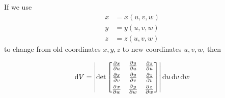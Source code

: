 If we use
\begin{align*}
x&=x(u,v,w) \\
y&=y(u,v,w) \\
z&=z(u,v,w)
\end{align*}
to change from old coordinates $x,y,z$ to new coordinates $u,v,w$,
then
\begin{impeqn}\label{eq dV}
\begin{align*}
\dee{V} 
   = \left|\det\left[\begin{matrix}
            \pdiff{x}{u}&\pdiff{y}{u}&\pdiff{z}{u}\\[0.05in] 
            \pdiff{x}{v}&\pdiff{y}{v}&\pdiff{z}{v}\\[0.05in] 
            \pdiff{x}{w}&\pdiff{y}{w}&\pdiff{z}{w}
       \end{matrix}\right]\right| \dee{u}\,\dee{v}\,\dee{w}
\end{align*}
\end{impeqn}

